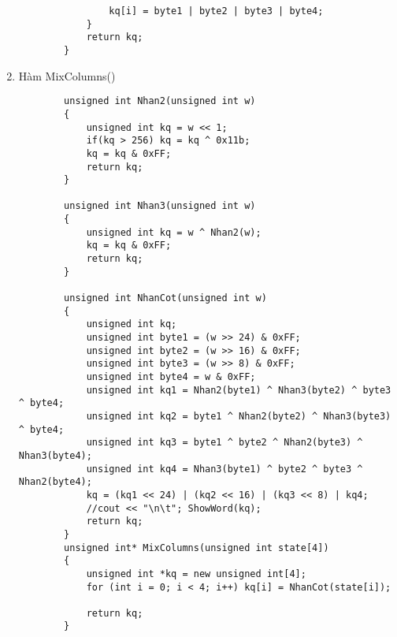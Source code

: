 \begin{enumerate}
\begin{verbatim}
				kq[i] = byte1 | byte2 | byte3 | byte4;
			}
			return kq;
		}
	\end{verbatim}
	\item Hàm MixColumns()
	\begin{verbatim}
		unsigned int Nhan2(unsigned int w)
		{
			unsigned int kq = w << 1;
			if(kq > 256) kq = kq ^ 0x11b;
			kq = kq & 0xFF;
			return kq;
		}
		
		unsigned int Nhan3(unsigned int w)
		{
			unsigned int kq = w ^ Nhan2(w);
			kq = kq & 0xFF;
			return kq;
		}
		
		unsigned int NhanCot(unsigned int w)
		{
			unsigned int kq;
			unsigned int byte1 = (w >> 24) & 0xFF;
			unsigned int byte2 = (w >> 16) & 0xFF;
			unsigned int byte3 = (w >> 8) & 0xFF;
			unsigned int byte4 = w & 0xFF;
			unsigned int kq1 = Nhan2(byte1) ^ Nhan3(byte2) ^ byte3 ^ byte4;
			unsigned int kq2 = byte1 ^ Nhan2(byte2) ^ Nhan3(byte3) ^ byte4;
			unsigned int kq3 = byte1 ^ byte2 ^ Nhan2(byte3) ^ Nhan3(byte4);
			unsigned int kq4 = Nhan3(byte1) ^ byte2 ^ byte3 ^ Nhan2(byte4);
			kq = (kq1 << 24) | (kq2 << 16) | (kq3 << 8) | kq4;
			//cout << "\n\t"; ShowWord(kq);
			return kq;
		}
		unsigned int* MixColumns(unsigned int state[4])
		{
			unsigned int *kq = new unsigned int[4];
			for (int i = 0; i < 4; i++) kq[i] = NhanCot(state[i]);
			
			return kq;
		}
	\end{verbatim}
\end{enumerate}

